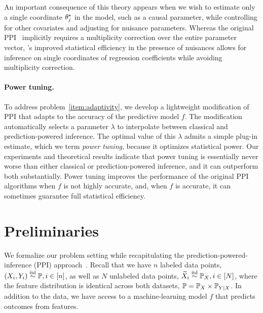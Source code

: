 An important consequence of this theory appears when we wish to estimate
only a single coordinate $\theta^\star_j$ in the model, such as a causal
parameter, while controlling for other covariates and adjusting for nuisance
parameters. Whereas the original PPI~\cite{AngelopoulosBaFaJoZr23} implicitly requires a multiplicity
correction over the entire parameter vector, \ppipp's improved statistical efficiency in the presence
of nuisances allows for inference on single coordinates of regression
coefficients while avoiding multiplicity correction.

\paragraph{\texttt{\raisebox{.0ex}{+}}Power tuning.}
To address problem~\ref{item:adaptivity}, we develop a lightweight
modification of PPI that adapts to the accuracy of the predictive model $f$.
The modification automatically selects a parameter $\lambda$ to interpolate
between classical and prediction-powered inference.  The optimal value of
this $\lambda$ admits a simple plug-in estimate, which we term \emph{power
tuning}, because it optimizes statistical power.  Our experiments and theoretical results indicate that power tuning
is essentially never worse than either classical or prediction-powered
inference, and it can outperform both substantially. Power tuning improves the
performance of the original PPI algorithms when $f$ is not
highly accurate, and, when $f$ is accurate, it can sometimes
guarantee full statistical efficiency.

\section{Preliminaries}

We formalize our problem setting while recapitulating the
prediction-powered-inference (PPI) approach~\cite{AngelopoulosBaFaJoZr23}.
Recall that we have $n$ labeled data points, $(X_i,Y_i) \stackrel{\rm iid}{\sim} \mathbb{P},
i\in[n]$, as well as $N$ unlabeled data points, $\widetilde X_i \stackrel{\rm iid}{\sim} \mathbb{P}_X,
i\in[N]$, where the feature distribution is identical across both
datasets, $\mathbb{P} = \mathbb{P}_X \times \mathbb{P}_{Y \mid X}$.  In addition to the data, we have
access to a machine-learning model $f$ that predicts outcomes from
features.

